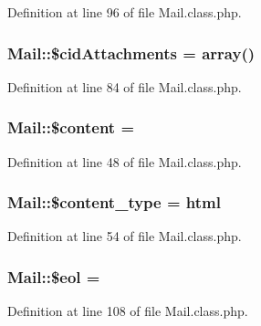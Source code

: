 Definition at line 96 of file Mail.\+class.\+php.

\hypertarget{classMail_a66c6752b550e4e8fd79a63b62815f48f}{}
\subsubsection[{\$cid\+Attachments}]{\setlength{\rightskip}{0pt plus 5cm}Mail\+::\$cid\+Attachments = array()}\label{classMail_a66c6752b550e4e8fd79a63b62815f48f}


Definition at line 84 of file Mail.\+class.\+php.

\hypertarget{classMail_a5a3320973718a2ca8a3fe798bf79c624}{}
\subsubsection[{\$content}]{\setlength{\rightskip}{0pt plus 5cm}Mail\+::\$content = \textquotesingle{}\textquotesingle{}}\label{classMail_a5a3320973718a2ca8a3fe798bf79c624}


Definition at line 48 of file Mail.\+class.\+php.

\hypertarget{classMail_ac933733b17efbb4978a46e557d32c440}{}
\subsubsection[{\$content\+\_\+type}]{\setlength{\rightskip}{0pt plus 5cm}Mail\+::\$content\+\_\+type = \textquotesingle{}html\textquotesingle{}}\label{classMail_ac933733b17efbb4978a46e557d32c440}


Definition at line 54 of file Mail.\+class.\+php.

\hypertarget{classMail_acaebf19cba0b8be83989e241c96f9eb7}{}
\subsubsection[{\$eol}]{\setlength{\rightskip}{0pt plus 5cm}Mail\+::\$eol = \textquotesingle{}\textquotesingle{}}\label{classMail_acaebf19cba0b8be83989e241c96f9eb7}


Definition at line 108 of file Mail.\+class.\+php.

\hypertarget{classMail_ace98431d0944d23544743094b443d506}{}
